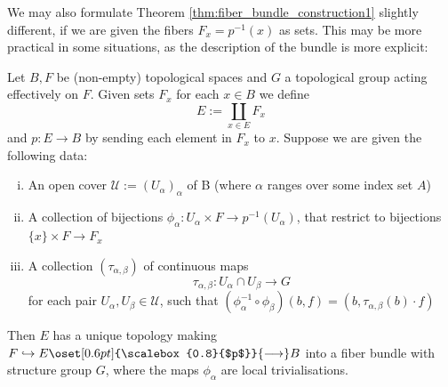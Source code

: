      We may also formulate Theorem \ref{thm:fiber_bundle_construction1} slightly different, if we are given the fibers $F_x = p^{-1}(x)$ as sets. This may be more practical in some situations, as the description of the bundle is more explicit:

     \begin{theorem}
        \label{thm:fiber_bundle_construction2}
        Let $B,F$ be (non-empty) topological spaces and $G$ a topological group acting effectively on $F$. Given sets $F_x$ for each $x \in B$ we define $$E := \coprod_{x \in E}F_x$$ and $p \colon E \to B$ by sending each element in $F_x$ to $x$. Suppose we are given the following data:
        \begin{enumerate}[(i)]
            \item An open cover $\mathcal{U} := (U_\alpha)_\alpha$ of B (where $\alpha$ ranges over some index set $A$)
            \item A collection of bijections $\phi_\alpha \colon U_\alpha \times F \to p^{-1}(U_\alpha)$, that restrict to bijections $\{x\} \times F \to F_x$
            \item  A collection $(\tau_{\alpha,\beta})$ of continuous maps
            \[
            \tau_{\alpha,\beta} \colon U_\alpha \cap U_\beta \to G
            \]
            for each pair $U_\alpha,U_\beta \in \mathcal{U}$, such that $(\phi_\alpha^{-1} \circ \phi_\beta)(b,f) = (b,\tau_{\alpha,\beta}(b) \cdot f)$
        \end{enumerate}
        Then $E$ has a unique topology making $F \hookrightarrow E \oset[0.6pt]{\scalebox{0.8}{$p$}}{\longrightarrow} B$ into a fiber bundle with structure group $G$, where the maps $\phi_\alpha$ are local trivialisations.
     \end{theorem}
